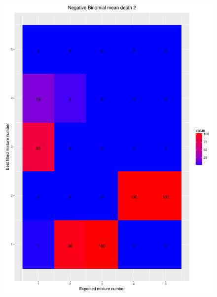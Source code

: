 \documentclass[11pt]{article}
\begin{document}
\begin{figure}[H]
\begin{center}
\includegraphics[scale=0.27]{../Results/Second_Analysis/Negative_Binomial_Confusion_Matrix_2.pdf}

\end{center}
\end{figure}
\end{document}
